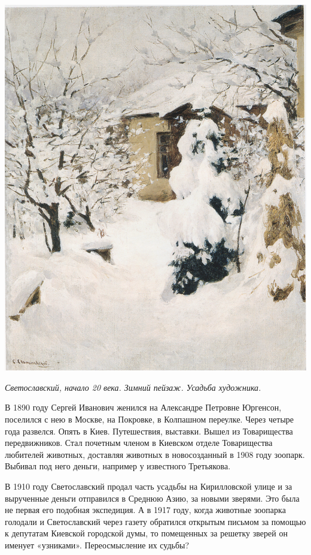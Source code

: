 \begin{center}
\includegraphics[width=\linewidth]{chast-kirvys/svetosl/sveto-zimniy-peizaj-usadba-hud-19xx.jpg}

\textit{Светославский, начало 20 века. Зимний пейзаж. Усадьба художника.}
\end{center}

В 1890 году Сергей Иванович женился на Александре Петровне Юргенсон, поселился с нею в Москве, на Покровке, в Колпашном переулке. Через четыре года развелся. Опять в Киев. Путешествия, выставки. Вышел из Товарищества передвижников. Стал почетным членом в Киевском отделе Товарищества любителей животных, доставляя животных в новосозданный в 1908 году зоопарк. Выбивал под него деньги, например у известного Третьякова. 

В 1910 году Светославский продал часть усадьбы на Кирилловской улице и за вырученные деньги отправился в Среднюю Азию, за новыми зверями. Это была не первая его подобная экспедиция. А в 1917 году, когда животные зоопарка голодали и Светославский через газету обратился открытым письмом за помощью к депутатам Киевской городской думы, то помещенных за решетку зверей он именует «узниками». Переосмысление их судьбы?

